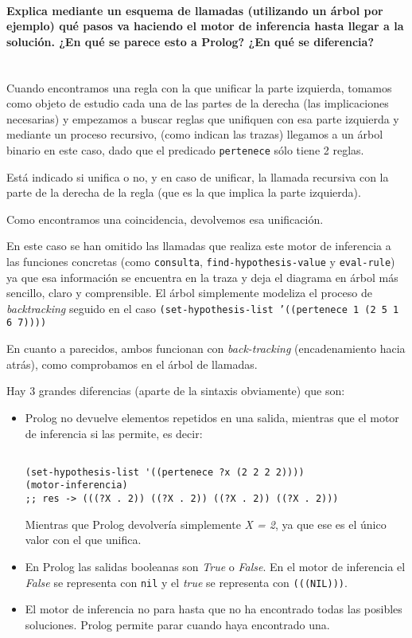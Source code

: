 \documentclass[nochap]{apuntes}
\begin{document}
\paragraph{Explica mediante un esquema de llamadas (utilizando un árbol por ejemplo) qué pasos va haciendo el motor de inferencia hasta llegar a la solución. ¿En qué se parece esto a Prolog? ¿En qué se diferencia?\\\\}

Cuando encontramos una regla con la que unificar la parte izquierda, tomamos como objeto de estudio cada una de las partes de la derecha (las implicaciones necesarias) y empezamos a buscar reglas que unifiquen con esa parte izquierda y mediante un proceso recursivo, (como indican las trazas) llegamos a un árbol binario en este caso, dado que el predicado \texttt{pertenece} sólo tiene 2 reglas.

Está indicado si unifica o no, y en caso de unificar, la llamada recursiva con la parte de la derecha de la regla (que es la que implica la parte izquierda).

Como encontramos una coincidencia, devolvemos esa unificación.

En este caso se han omitido las llamadas que realiza este motor de inferencia a las funciones concretas (como \texttt{consulta}, \texttt{find-hypothesis-value} y \texttt{eval-rule}) ya que esa información se encuentra en la traza y deja el diagrama en árbol más sencillo, claro y comprensible. El árbol simplemente modeliza el proceso de \textit{backtracking} seguido en el caso \texttt{(set-hypothesis-list '((pertenece 1 (2 5 1 6 7))))}
\newpage
{}

En cuanto a parecidos, ambos funcionan con \textit{back-tracking} (encadenamiento hacia atrás), como comprobamos en el árbol de llamadas.

Hay 3 grandes diferencias (aparte de la sintaxis obviamente) que son:
\begin{itemize}
\item Prolog no devuelve elementos repetidos  en una salida, mientras que el motor de inferencia si las permite, es decir:
\begin{lstlisting}[frame=single]

(set-hypothesis-list '((pertenece ?x (2 2 2 2))))
(motor-inferencia)
;; res -> (((?X . 2)) ((?X . 2)) ((?X . 2)) ((?X . 2)))
\end{lstlisting}
Mientras que Prolog devolvería simplemente \textit{X = 2}, ya que ese es el único valor con el que unifica.
\item En Prolog las salidas booleanas son \textit{True} o \textit{False}. En el motor de inferencia el \textit{False} se representa con \texttt{nil} y el \textit{true} se representa con \texttt{(((NIL)))}.
\item El motor de inferencia no para hasta que no ha encontrado todas las posibles soluciones. Prolog permite parar cuando haya encontrado una.
\end{itemize}
\end{document}
